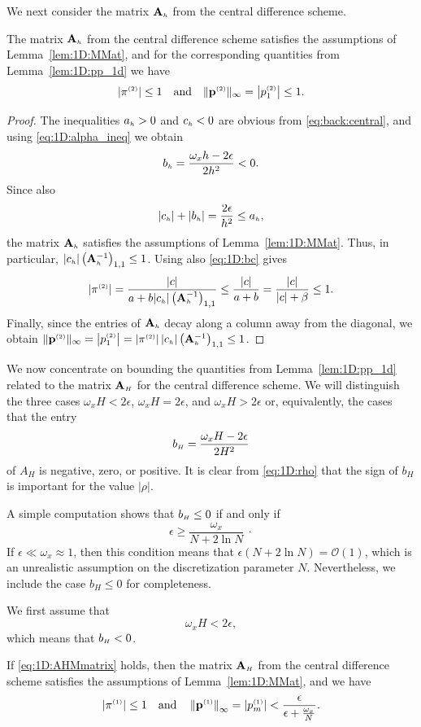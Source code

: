 We next consider the matrix $\mathbf{A}_{\scriptscriptstyle h}$ from the central difference scheme.

\begin{lemma}\label{lem:1D:p2}
The matrix $\mathbf{A}_{\scriptscriptstyle h}$ from the central difference scheme satisfies the
assumptions of Lemma~\ref{lem:1D:MMat}, and for the corresponding quantities from
Lemma~\ref{lem:1D:pp_1d} we have
%
$$\left|\pi^{\scriptscriptstyle (2)}\right|\leq 1 \quad\mbox{and}\quad
\|\mathbf{p}^{\scriptscriptstyle (2)}\|_\infty=\left|p^{\scriptscriptstyle (2)}_{1}\right|\leq 1.$$
\end{lemma}

\begin{proof}
The inequalities $a_{\scriptscriptstyle h}>0$ and $c_{\scriptscriptstyle h}<0$ are obvious from
\eqref{eq:back:central}, and using \eqref{eq:1D:alpha_ineq} we obtain
%
$$b_{\scriptscriptstyle h}=\frac{\omega_x h-2\epsilon}{2h^{2}}<0.$$
%
Since also
%
$$|c_{\scriptscriptstyle h}|+|b_{\scriptscriptstyle h}|=\frac{2\epsilon}{h^{2}}\leq a_{\scriptscriptstyle h},$$
%
the matrix $\mathbf{A}_{\scriptscriptstyle h}$ satisfies the assumptions of Lemma~\ref{lem:1D:MMat}. Thus,
in particular, $|c_{\scriptscriptstyle h}| \left(\mathbf{A}_{\scriptscriptstyle h} ^{-1}\right)_{1,1}\leq 1$.
Using also \eqref{eq:1D:bc} gives
%
$$|\pi^{\scriptscriptstyle (2)}|=\frac{|c| }{a + b |c_{\scriptscriptstyle h}|
\left(\mathbf{A}_{\scriptscriptstyle h} ^{-1}\right)_{1,1}}\leq
\frac{|c| }{a + b}
= \frac{|c| }{|c|+\beta}\leq 1.$$
%
Finally, since the entries of $\mathbf{A}_{\scriptscriptstyle h}$ decay along a column away from the
diagonal, we obtain
%
$\|\mathbf{p}^{\scriptscriptstyle (2)}\|_\infty=
\left|p^{\scriptscriptstyle (2)}_{1}\right|=|\pi^{\scriptscriptstyle (2)}|\,|c_{\scriptscriptstyle h}| \left(\mathbf{A}_{\scriptscriptstyle h} ^{-1}\right)_{1,1}
\leq 1$.
%
\end{proof}

We now concentrate on bounding the quantities from Lemma~\ref{lem:1D:pp_1d} related
to the matrix $\mathbf{A}_{\scriptscriptstyle H}$ for the central difference scheme. We will distinguish
the three cases $\omega_x H<2\epsilon$, $\omega_x H=2\epsilon$, and $\omega_x
H>2\epsilon$ or, equivalently, the cases that the entry
%
$$b_{\scriptscriptstyle H}=\frac{\omega_x H-2\epsilon}{2H^{2}}$$
%
of $A_H$ is negative, zero, or positive. It is clear from \eqref{eq:1D:rho} that
the sign of $b_H$ is important for the value $|\rho|$.

A simple computation shows that $b_{\scriptscriptstyle H}\leq 0$ if and only if
%
$$\epsilon \geq \frac{\omega_x}{N+2\ln N} ~\cdot$$
%
If $\epsilon \ll \omega_x\approx 1$, then this condition means that
$\epsilon (N+2\ln N) = \mathscr{O}(1)$, which is an
unrealistic assumption on the discretization parameter $N$. Nevertheless, we
include the case $b_H\leq 0$ for completeness.

We first assume that
%
\begin{equation}
\omega_x H<2\epsilon,\label{eq:1D:AHMmatrix}
\end{equation}
%
which means that $b_{\scriptscriptstyle H}<0$.
%
\begin{lemma}\label{lem:1D:p3}
If \eqref{eq:1D:AHMmatrix} holds, then the matrix $\mathbf{A}_{\scriptscriptstyle H}$ from the central
difference scheme satisfies the assumptions of Lemma~\ref{lem:1D:MMat}, and we have
%
\begin{equation*}%
\left|\piOne\right|\leq 1 \quad\mbox{and}\quad
\left\Vert\pOne\right\Vert_\infty=\left|p^{\klein{(1)}}_{m}\right|
<\frac{\epsilon}{\epsilon+\frac{\omega_x}{N}}.
\end{equation*}
\end{lemma}


